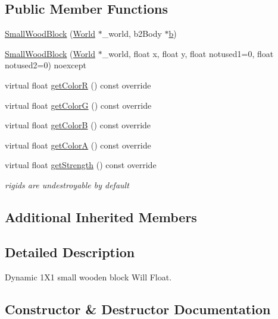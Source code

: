 \subsection*{Public Member Functions}
\begin{DoxyCompactItemize}
\item 
\hyperlink{classSmallWoodBlock_aca92d8073d1d1cad52895e0597260c14}{Small\+Wood\+Block} (\hyperlink{classWorld}{World} $\ast$\+\_\+world, b2\+Body $\ast$\hyperlink{image_8h_ab2d05693952610f937e5acb3c4a8fa1b}{b})
\item 
\hyperlink{classSmallWoodBlock_a6569dfd449c961b00003e32b7a7ec0b8}{Small\+Wood\+Block} (\hyperlink{classWorld}{World} $\ast$\+\_\+world, float x, float y, float notused1=0, float notused2=0) noexcept
\item 
virtual float \hyperlink{classSmallWoodBlock_a8cb7ec9e82df6465c1d069e1d3167d4c}{get\+Color\+R} () const override
\item 
virtual float \hyperlink{classSmallWoodBlock_ac83d1610c7a0acf7ac8a1eb569b92380}{get\+Color\+G} () const override
\item 
virtual float \hyperlink{classSmallWoodBlock_ad85ea47531644ea51905b2fbe014122d}{get\+Color\+B} () const override
\item 
virtual float \hyperlink{classSmallWoodBlock_a88c753e9e05364d2a872250bed48563d}{get\+Color\+A} () const override
\item 
virtual float \hyperlink{classSmallWoodBlock_a5c9563cd2e2ff191d0407ca05e2332af}{get\+Strength} () const override
\begin{DoxyCompactList}\small\item\em rigids are undestroyable by default \end{DoxyCompactList}\end{DoxyCompactItemize}
\subsection*{Additional Inherited Members}


\subsection{Detailed Description}
Dynamic 1\+X1 small wooden block Will Float. 

\subsection{Constructor \& Destructor Documentation}
\hypertarget{classSmallWoodBlock_aca92d8073d1d1cad52895e0597260c14}{}
